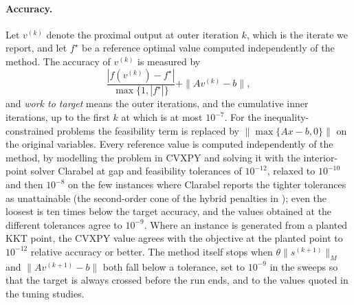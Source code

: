 \documentclass[11pt]{article}
\begin{document}
\paragraph{Accuracy.}
Let $v^{(k)}$ denote the proximal output at outer iteration $k$, which is the iterate we report, and let $f^\star$ be a reference optimal value computed independently of the method.
The accuracy of $v^{(k)}$ is measured by
\begin{equation}\label{eq:accuracy-measure}
    \frac{|f(v^{(k)}) - f^\star|}{\max\{1, |f^\star|\}} + \|A v^{(k)} - b\|,
\end{equation}
and \emph{work to target} means the outer iterations, and the cumulative inner iterations, up to the first $k$ at which  is at most $10^{-7}$.
For the inequality-constrained problems the feasibility term is replaced by $\|\max\{Ax - b, 0\}\|$ on the original variables.
Every reference value is computed independently of the method, by modelling the problem in CVXPY \cite{diamond2016cvxpy,agrawal2018rewriting} and solving it with the interior-point solver Clarabel \cite{goulart2024clarabel} at gap and feasibility tolerances of $10^{-12}$, relaxed to $10^{-10}$ and then $10^{-8}$ on the few instances where Clarabel reports the tighter tolerances as unattainable (the second-order cone of the hybrid penalties in ); even the loosest is ten times below the target accuracy, and the values obtained at the different tolerances agree to $10^{-9}$.
Where an instance is generated from a planted KKT point, the CVXPY value agrees with the objective at the planted point to $10^{-12}$ relative accuracy or better.
The method itself stops when $\theta\|s^{(k+1)}\|_M$ and $\|A v^{(k+1)} - b\|$ both fall below a tolerance, set to $10^{-9}$ in the sweeps so that the target is always crossed before the run ends, and to the values quoted in the tuning studies.
\end{document}
